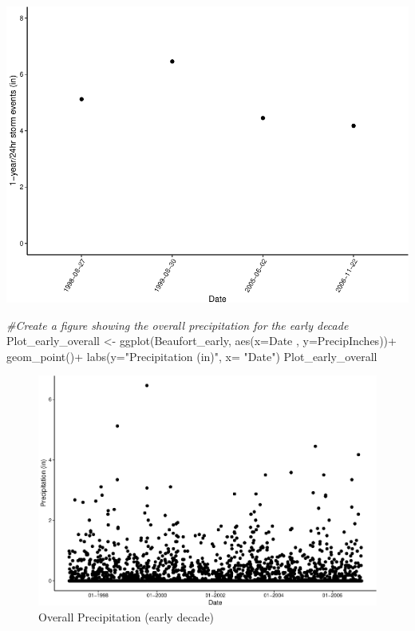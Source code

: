 \documentclass[
  12pt,
]{article}
\newenvironment{Shaded}{\begin{snugshade}}{\end{snugshade}}
\newcommand{\AttributeTok}[1]{\textcolor[rgb]{0.77,0.63,0.00}{#1}}
\newcommand{\CommentTok}[1]{\textcolor[rgb]{0.56,0.35,0.01}{\textit{#1}}}
\newcommand{\FunctionTok}[1]{\textcolor[rgb]{0.00,0.00,0.00}{#1}}
\newcommand{\NormalTok}[1]{#1}
\newcommand{\OtherTok}[1]{\textcolor[rgb]{0.56,0.35,0.01}{#1}}
\newcommand{\SpecialCharTok}[1]{\textcolor[rgb]{0.00,0.00,0.00}{#1}}
\newcommand{\StringTok}[1]{\textcolor[rgb]{0.31,0.60,0.02}{#1}}
\begin{document}
\includegraphics{Final_Project_Thornton_Katayama_Ngenzi_files/figure-latex/early plot 1-1.pdf}
\newpage

\begin{Shaded}
\begin{Highlighting}[]
\CommentTok{\#Create a figure showing the overall precipitation for the early decade}
\NormalTok{Plot\_early\_overall }\OtherTok{\textless{}{-}} \FunctionTok{ggplot}\NormalTok{(Beaufort\_early, }
                             \FunctionTok{aes}\NormalTok{(}\AttributeTok{x=}\NormalTok{Date , }\AttributeTok{y=}\NormalTok{PrecipInches))}\SpecialCharTok{+}
  \FunctionTok{geom\_point}\NormalTok{()}\SpecialCharTok{+}
  \FunctionTok{labs}\NormalTok{(}\AttributeTok{y=}\StringTok{"Precipitation (in)"}\NormalTok{, }\AttributeTok{x=} \StringTok{"Date"}\NormalTok{)}
\NormalTok{Plot\_early\_overall}
\end{Highlighting}
\end{Shaded}

\begin{figure}
\centering
\includegraphics{Final_Project_Thornton_Katayama_Ngenzi_files/figure-latex/early plot 2-1.pdf}
\caption{Overall Precipitation (early decade)}
\end{figure}
\end{document}
